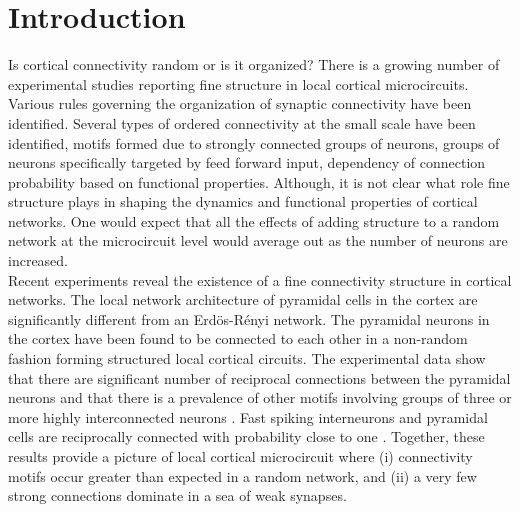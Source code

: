 \section{Introduction}
Is cortical connectivity random or is it organized? There is a growing number of experimental studies reporting fine structure in local cortical microcircuits. Various rules governing the organization of synaptic connectivity have been identified. Several types of ordered connectivity at the small scale have been identified, motifs formed due to strongly connected groups of neurons, groups of neurons specifically targeted by feed forward input, dependency of connection probability based on functional properties. Although, it is not clear what role fine structure plays in shaping the dynamics and functional properties of cortical networks. One would expect that all the effects of adding structure to a random network at the microcircuit level would average out as the number of neurons are increased. \\

Recent experiments reveal the existence of a fine connectivity structure in cortical networks. The local network architecture of pyramidal cells in the cortex are significantly different from an Erdös-Rényi network. The pyramidal neurons in the cortex have been found to be connected to each other in a non-random fashion forming structured local cortical circuits. The experimental data show that there are significant number of reciprocal connections between the pyramidal neurons and that there is a prevalence of other motifs involving groups of three or more highly interconnected neurons \cite{markram1997,thomson2002, Song2005, Perin2011}. Fast spiking interneurons and pyramidal cells are reciprocally connected with probability close to one \cite{Yoshimura2005}. Together, these results provide a picture of local cortical microcircuit where (i) connectivity motifs occur greater than expected in a random network, and (ii) a very few strong connections dominate in a sea of weak synapses.\\

